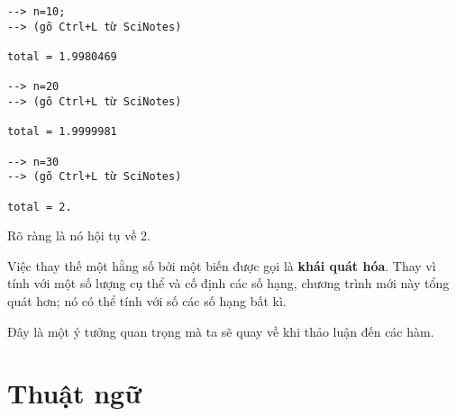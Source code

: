 \documentclass[12pt]{book}
\begin{document}
\begin{verbatim}
--> n=10; 
--> (gõ Ctrl+L từ SciNotes)

total = 1.9980469

--> n=20
--> (gõ Ctrl+L từ SciNotes)

total = 1.9999981

--> n=30
--> (gõ Ctrl+L từ SciNotes)

total = 2.
\end{verbatim}
%
Rõ ràng là nó hội tụ về 2.

Việc thay thế một hằng số bởi một biến được gọi là 
{\bf khái quát hóa}. Thay vì tính với một số lượng cụ thể 
và cố định các số hạng, chương trình mới này tổng quát hơn;
nó có thể tính với số các số hạng bất kì.

Đây là một ý tưởng quan trọng mà ta sẽ quay về khi thảo luận
đến các hàm.


\section{Thuật ngữ}
\end{document}
